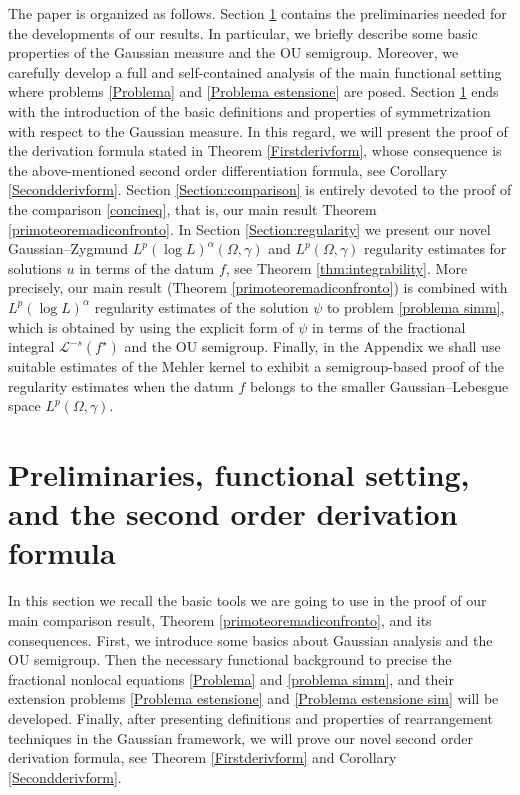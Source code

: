 \documentclass[a4paper,10pt,reqno]{amsart}
\numberwithin{equation}{section}
\begin{document}
The paper is organized as follows. Section \ref{Preliminari} contains
the preliminaries needed for the developments of our results.
In particular, we briefly describe some basic properties of the Gaussian measure and the
OU semigroup. Moreover, we carefully develop a full and self-contained analysis of the main
functional setting where problems \eqref{Problema} and \eqref{Problema estensione} are posed.
Section \ref{Preliminari} ends with the introduction of the basic definitions
and properties of symmetrization with respect to the Gaussian measure. In this regard, we will present the proof of the derivation formula stated in
Theorem \ref{Firstderivform}, whose consequence is the above-mentioned second order differentiation formula, see Corollary \ref{Secondderivform}.
Section \ref{Section:comparison} is entirely devoted to the proof
of the comparison \eqref{concineq}, that is, our main result Theorem \ref{primoteoremadiconfronto}.
In Section \ref{Section:regularity} we present our novel
Gaussian--Zygmund $L^p(\log L)^\alpha(\Omega,\gamma)$ and $L^p(\Omega,\gamma)$
regularity estimates for solutions $u$ in
terms of the datum $f$, see Theorem \ref{thm:integrability}.
More precisely, our main result (Theorem \ref{primoteoremadiconfronto})
is combined with $L^p(\log L)^\alpha$ regularity estimates of the solution $\psi$
to problem \eqref{problema simm}, which is obtained by using the explicit form
of $\psi$ in terms of the fractional integral $\mathcal{L}^{-s}(f^{\star})$ and the OU semigroup.
Finally, in the Appendix we shall use suitable estimates of the Mehler kernel
to exhibit a semigroup-based proof of the regularity estimates when the datum
$f$ belongs to the smaller Gaussian--Lebesgue space $L^p(\Omega,\gamma)$.

\section{Preliminaries, functional setting, and the second order derivation formula}\label{Preliminari}

In this section we recall the basic tools we
are going to use in the proof of our main comparison result,
Theorem \ref{primoteoremadiconfronto}, and its
consequences. First, we introduce some basics about Gaussian analysis and the OU semigroup.
Then the necessary functional
background to precise the fractional nonlocal equations \eqref{Problema} and \eqref{problema simm},
and their extension problems \eqref{Problema estensione} and \eqref{Problema estensione sim}
will be developed. Finally, after presenting
definitions and properties of rearrangement techniques in the Gaussian
framework, we will prove our novel
second order derivation formula, see Theorem \ref{Firstderivform}
and Corollary \ref{Secondderivform}.
\end{document}
